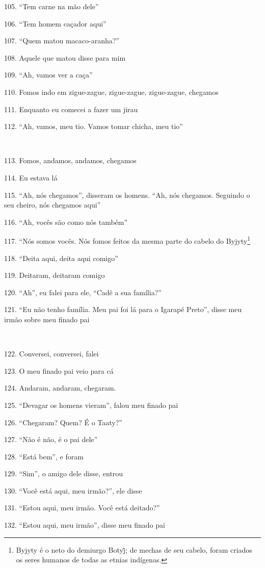 105. ``Tem carne na mão dele''

106. ``Tem homem caçador aqui''

107. ``Quem matou macaco-aranha?''

108. Aquele que matou disse para mim

109. ``Ah, vamos ver a caça''

110. Fomos indo em zigue-zague, zigue-zague, zigue-zague, chegamos

111. Enquanto eu comecei a fazer um jirau

112. ``Ah, vamos, meu tio. Vamos tomar chicha, meu tio''

~

113. Fomos, andamos, andamos, chegamos

114. Eu estava lá

115. ``Ah, nós chegamos'', disseram os homens. ``Ah, nós chegamos.
Seguindo o seu cheiro, nós chegamos aqui''

116. ``Ah, vocês são como nós também''

117. ``Nós somos vocês. Nós fomos feitos da mesma parte do cabelo do
Byjyty\footnote{Byjyty é o neto do demiurgo Botyj̃;  de mechas de seu
  cabelo, foram criados os seres humanos de todas as etnias indígenas.}

118. ``Deita aqui, deita aqui comigo''

119. Deitaram, deitaram comigo

120. ``Ah'', eu falei para ele, ``Cadê a sua família?''

121. ``Eu não tenho família. Meu pai foi lá para o Igarapé Preto'', disse
meu irmão sobre meu finado pai

~

122. Conversei, conversei, falei

123. O meu finado pai veio para cá

124. Andaram, andaram, chegaram.

125. ``Devagar os homens vieram'', falou meu finado pai

126. ``Chegaram? Quem? É o Taaty?''

127. ``Não é não, é o pai dele''

128. ``Está bem'', e foram

129. ``Sim'', o amigo dele disse, entrou

130. ``Você está aqui, meu irmão?'', ele disse

131. ``Estou aqui, meu irmão. Você está deitado?''

132. ``Estou aqui, meu irmão'', disse meu finado pai

